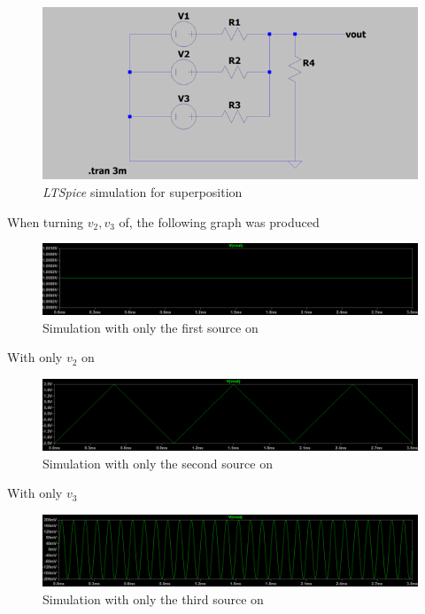 \documentclass[english,12pt]{article}
\newcommand{\ltspice}[]{\textit{LTSpice} }
\begin{document}
\begin{figure}[h]
    \centering
    \includegraphics[scale=0.8]{exp1-circuit.png}
    \caption{\ltspice simulation for superposition}
    \label{fig:9}
\end{figure}

When turning $v_2,v_3$ of, the following graph was produced

\begin{figure}[h]
    \centering
    \includegraphics[scale=0.25]{exp1-v1.png}
    \caption{Simulation with only the first source on}
    \label{fig:10}
\end{figure}

\newpage
With only $v_2$ on

\begin{figure}[h]
    \centering
    \includegraphics[scale=0.25]{exp1-v2.png}
    \caption{Simulation with only the second source on}
    \label{fig:11}
\end{figure}

With only $v_3$

\begin{figure}[h]
    \centering
    \includegraphics[scale=0.25]{exp1-v3.png}
    \caption{Simulation with only the third source on}
    \label{fig:12}
\end{figure}
\end{document}
